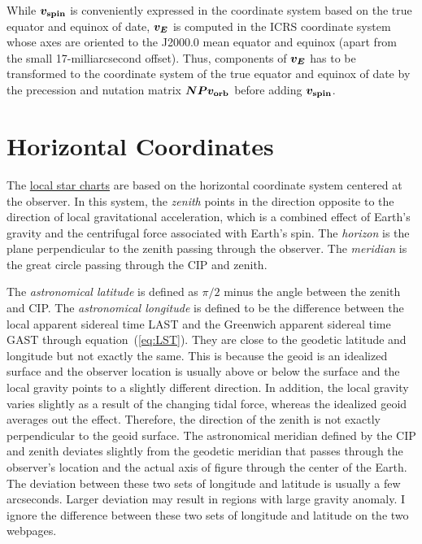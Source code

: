 \documentclass[12pt]{article}
\newcommand{\ve}[1]{\mbox{\boldmath $#1$}}
\begin{document}
While $\ve{v_{\rm spin}}$ is conveniently expressed in the coordinate system based 
on the true equator and equinox of date, $\ve{v_E}$ is computed in 
the ICRS coordinate system whose axes are oriented to the J2000.0 mean equator 
and equinox (apart from the small 17-milliarcsecond offset). Thus, 
components of $\ve{v_E}$ has to be 
transformed to the coordinate system of the true equator and equinox of date 
by the precession and nutation matrix $\ve{N P v_{\rm orb}}$ before adding 
$\ve{v_{\rm spin}}$.

\section{Horizontal Coordinates}

The \href{../sidereal.html}{local star charts} are based on the horizontal 
coordinate system centered at the observer. In this system, the {\em zenith} 
points in the direction opposite to the direction of local gravitational 
acceleration, which is a combined effect of Earth's gravity and the centrifugal 
force associated with Earth's spin. The {\em horizon} is the plane 
perpendicular to the zenith passing through the observer. The {\em meridian} 
is the great circle passing through the CIP and zenith.

The {\em astronomical latitude} is defined as $\pi/2$ minus the angle between 
the zenith and CIP. The {\em astronomical longitude} is defined to be the 
difference between the local apparent sidereal time LAST and the Greenwich 
apparent sidereal time GAST through equation~(\ref{eq:LST}).
They are close to the geodetic latitude and longitude but not exactly the same. 
This is because the geoid 
is an idealized surface and the observer location is usually above or below the 
surface and the local gravity points to a slightly different direction. 
In addition, the local gravity varies slightly as a result of the changing 
tidal force, whereas the idealized geoid averages out the effect. Therefore, 
the direction of the zenith is not exactly perpendicular to the geoid surface.
The astronomical meridian defined by the CIP and zenith deviates slightly from the 
geodetic meridian that passes through the observer's location and the actual axis 
of figure through the center of the Earth. The deviation between these two sets 
of longitude and latitude is usually a few arcseconds. Larger deviation may result 
in regions with large gravity anomaly. I ignore the difference between these 
two sets of longitude and latitude on the two webpages.
\end{document}
